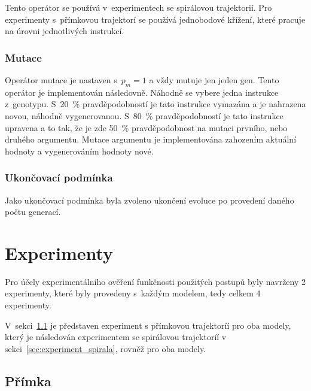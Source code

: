 Tento operátor se používá v~experimentech se spirálovou trajektorií.
Pro experimenty s~přímkovou trajektorí se používá jednobodové křížení, které pracuje na úrovni jednotlivých instrukcí.

\subsection{Mutace}
Operátor mutace je nastaven s~$p_m = 1$ a vždy mutuje jen jeden gen.
Tento operátor je implementován následovně.
Náhodně se vybere jedna instrukce z~genotypu.
S~20~\% pravděpodobností je tato instrukce vymazána a je nahrazena novou, náhodně vygenerovanou.
S~80~\% pravděpodobností je tato instrukce upravena a to tak, že je zde 50~\% pravděpodobnost na mutaci prvního, nebo druhého argumentu.
Mutace argumentu je implementována zahozením aktuální hodnoty a vygenerováním hodnoty nové.


\subsection{Ukončovací podmínka}
Jako ukončovací podmínka byla zvoleno ukončení evoluce po provedení daného počtu generací.



\chapter{Experimenty}
\label{chap:experimenty}
Pro účely experimentálního ověření funkčnosti použitých postupů byly navrženy 2 experimenty, které byly provedeny s~každým modelem, tedy celkem 4 experimenty.

V~sekci~\ref{sec:experiment_primka} je představen experiment s přímkovou trajektoríí pro oba modely, který je následován experimentem se spirálovou trajektoríí v sekci~\ref{sec:experiment_spirala}, rovněž pro oba modely.


\section{Přímka}
\label{sec:experiment_primka}

